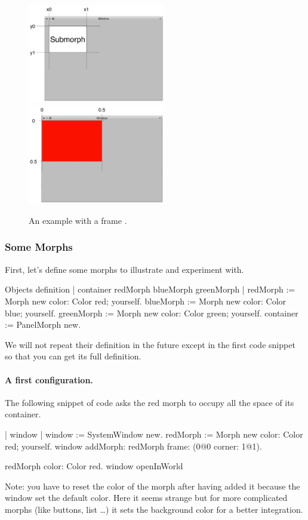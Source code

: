 \documentclass[a4paper,10pt,twoside]{book}
\begin{document}
\begin{figure}[ht]\centering
	\includegraphics[width=6cm]{DefaultFrame}\includegraphics[width=6cm]{FrameExplanation}
	\caption{An example with a frame .}
	\label{fig:frameExplanation}
\end{figure}

\subsubsection{Some Morphs}
First, let's define some morphs to illustrate and experiment with.
\begin{code}{Objects definition}
| container redMorph blueMorph greenMorph |
redMorph := Morph new color: Color red; yourself.				
blueMorph := Morph new color: Color blue; yourself.
greenMorph := Morph new  color: Color green; yourself.
container := PanelMorph new.
\end{code}

We will not repeat their definition in the future except in the first code snippet so that you can 
get its full definition. 

\paragraph{A first configuration.}
The following snippet of code asks the red morph to occupy all the space of its container.
\begin{code}{}
| window |
window := SystemWindow new.
redMorph := Morph new color: Color red; yourself.	
window
	addMorph: redMorph
	frame: (0@0 corner: 1@1).
	
redMorph color: Color red.	
window openInWorld
\end{code}
Note: you have to reset the color of the morph after having added it because the window set the default color. Here it seems strange but for more complicated morphs (like buttons, list \dots) it sets the background color for a better integration.
\end{document}
